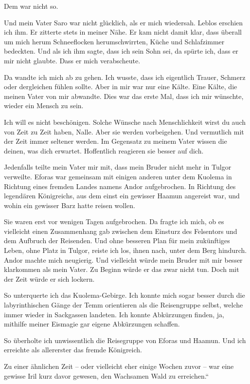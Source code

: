 Dem war nicht so.

Und mein Vater Saro war nicht glücklich, als er mich wiedersah. Leblos erschien ich ihm. Er zitterte stets in meiner Nähe. Er kam nicht damit klar, dass überall um mich herum Schneeflocken herumschwirrten, Küche und Schlafzimmer bedeckten. Und als ich ihm sagte, dass ich sein Sohn sei, da spürte ich, dass er mir nicht glaubte. Dass er mich verabscheute.

Da wandte ich mich ab zu gehen. Ich wusste, dass ich eigentlich Trauer, Schmerz oder dergleichen fühlen sollte. Aber in mir war nur eine Kälte. Eine Kälte, die meinen Vater von mir abwandte. Dies war das erste Mal, dass ich mir wünschte, wieder ein Mensch zu sein.

Ich will es nicht beschönigen. Solche Wünsche nach Menschlichkeit wirst du auch von Zeit zu Zeit haben, Nalle. Aber sie werden vorbeigehen. Und vermutlich mit der Zeit immer seltener werden. Im Gegensatz zu meinem Vater wissen die deinen, was dich erwartet. Hoffentlich reagieren sie besser auf dich.

Jedenfalls teilte mein Vater mir mit, dass mein Bruder nicht mehr in Tulgor verweilte. Eforas war gemeinsam mit einigen anderen unter dem Kuolema in Richtung eines fremden Landes namens Andor aufgebrochen. In Richtung des legendären Königreichs, aus dem einst ein gewisser Haamun angereist war, und wohin ein gewisser Barz hatte reisen wollen.

Sie waren erst vor wenigen Tagen aufgebrochen. Da fragte ich mich, ob es vielleicht einen Zusammenhang gab zwischen dem Einsturz des Felsentors und dem Aufbruch der Reisenden. Und ohne besseren Plan für mein zukünftiges Leben, ohne Platz in Tulgor, reiste ich los, ihnen nach, unter dem Berg hindurch. Andor machte mich neugierig. Und vielleicht würde mein Bruder mit mir besser klarkommen als mein Vater. Zu Beginn würde er das zwar nicht tun. Doch mit der Zeit würde er sich lockern.

So unterquerte ich das Kuolema-Gebirge. Ich konnte mich sogar besser durch die labyrinthischen Gänge der Temm orientieren als die Reisengruppe selbst, welche immer wieder in Sackgassen landeten. Ich konnte Abkürzungen finden, ja, mithilfe meiner Eismagie gar eigene Abkürzungen schaffen.

So überholte ich unwissentlich die Reisegruppe von Eforas und Haamun. Und ich erreichte als allererster das fremde Königreich.

Zu einer ähnlichen Zeit – oder vielleicht eher einige Wochen zuvor – war eine gewisse Iril kurz davor gewesen, den Wachsamen Wald zu erreichen.“

